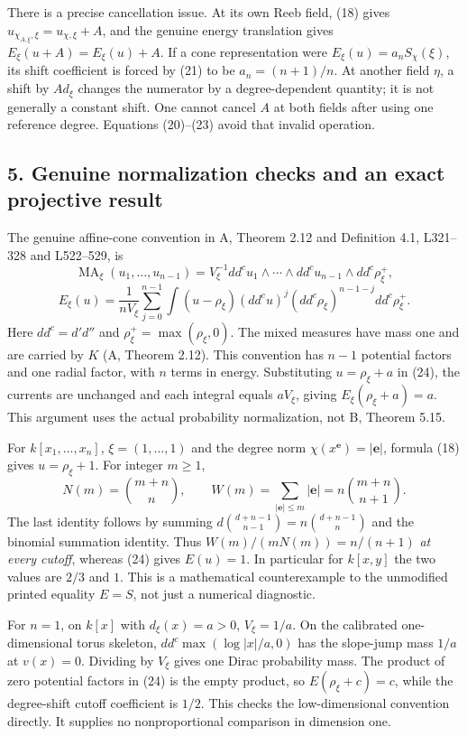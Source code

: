 \documentclass[
  11pt,
]{article}
\begin{document}
There is a precise cancellation issue. At its own Reeb field, (18) gives
\(u_{\chi_{A,\xi},\xi}=u_{\chi,\xi}+A\), and the genuine energy
translation gives \(E_\xi(u+A)=E_\xi(u)+A\). If a cone representation
were \(E_\xi(u)=a_nS_\chi(\xi)\), its shift coefficient is forced by
(21) to be \(a_n=(n+1)/n\). At another field \(\eta\), a shift by
\(A d_\xi\) changes the numerator by a degree-dependent quantity; it is
not generally a constant shift. One cannot cancel \(A\) at both fields
after using one reference degree. Equations (20)--(23) avoid that
invalid operation.

\subsection{5. Genuine normalization checks and an exact projective
result}\label{genuine-normalization-checks-and-an-exact-projective-result}

The genuine affine-cone convention in A, Theorem 2.12 and Definition
4.1, L321--328 and L522--529, is \[
 \operatorname{MA}_\xi(u_1,\ldots,u_{n-1})=
 V_\xi^{-1}dd^c u_1\wedge\cdots\wedge dd^c u_{n-1}
                  \wedge dd^c\rho_\xi^+,
\] \[
 E_\xi(u)=\frac1{nV_\xi}\sum_{j=0}^{n-1}
 \int (u-\rho_\xi)(dd^c u)^j(dd^c\rho_\xi)^{n-1-j}
                              dd^c\rho_\xi^+.       \tag{24}
\] Here \(dd^c=d'd''\) and \(\rho_\xi^+=\max(\rho_\xi,0)\). The mixed
measures have mass one and are carried by \(K\) (A, Theorem 2.12). This
convention has \(n-1\) potential factors and one radial factor, with
\(n\) terms in energy. Substituting \(u=\rho_\xi+a\) in (24), the
currents are unchanged and each integral equals \(aV_\xi\), giving
\(E_\xi(\rho_\xi+a)=a\). This argument uses the actual probability
normalization, not B, Theorem 5.15.

For \(k[x_1,\ldots,x_n]\), \(\xi=(1,\ldots,1)\) and the degree norm
\(\chi(x^{\mathbf e})=|\mathbf e|\), formula (18) gives
\(u=\rho_\xi+1\). For integer \(m\geq1\), \[
 N(m)=\binom{m+n}{n},\qquad
 W(m)=\sum_{|\mathbf e|\leq m}|\mathbf e|
      =n\binom{m+n}{n+1}.
\] The last identity follows by summing
\(d\binom{d+n-1}{n-1}=n\binom{d+n-1}{n}\) and the binomial summation
identity. Thus \(W(m)/(mN(m))=n/(n+1)\) \emph{at every cutoff}, whereas
(24) gives \(E(u)=1\). In particular for \(k[x,y]\) the two values are
\(2/3\) and \(1\). This is a mathematical counterexample to the
unmodified printed equality \(E=S\), not just a numerical diagnostic.

For \(n=1\), on \(k[x]\) with \(d_\xi(x)=a>0\), \(V_\xi=1/a\). On the
calibrated one-dimensional torus skeleton, \(dd^c\max(\log|x|/a,0)\) has
the slope-jump mass \(1/a\) at \(v(x)=0\). Dividing by \(V_\xi\) gives
one Dirac probability mass. The product of zero potential factors in
(24) is the empty product, so \(E(\rho_\xi+c)=c\), while the
degree-shift cutoff coefficient is \(1/2\). This checks the
low-dimensional convention directly. It supplies no nonproportional
comparison in dimension one.
\end{document}
